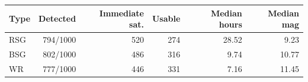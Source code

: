 \begin{tabular}{lrrrrr}\toprule
Type & Detected & Immediate sat. & Usable & Median hours & Median mag \\ \midrule
RSG & 794/1000 & 520 & 274 & 28.52 & 9.23 \\
BSG & 802/1000 & 486 & 316 & 9.74 & 10.77 \\
WR & 777/1000 & 446 & 331 & 7.16 & 11.45 \\
\bottomrule\end{tabular}